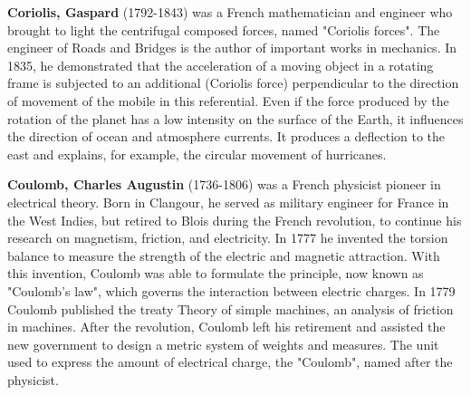 \textbf{Coriolis, Gaspard} (1792-1843) was a French mathematician and engineer who brought to light the centrifugal composed forces, named "Coriolis forces". The engineer of Roads and Bridges is the author of important works in mechanics. In 1835, he demonstrated that the acceleration of a moving object in a rotating frame is subjected to an additional (Coriolis force) perpendicular to the direction of movement of the mobile in this referential. Even if the force produced by the rotation of the planet has a low intensity on the surface of the Earth, it influences the direction of ocean and atmosphere currents. It produces a deflection to the east and explains, for example, the circular movement of hurricanes.

\textbf{Coulomb, Charles Augustin} (1736-1806) was a French physicist pioneer in electrical theory. Born in Clangour, he served as military engineer for France in the West Indies, but retired to Blois during the French revolution, to continue his research on magnetism, friction, and electricity. In 1777 he invented the torsion balance to measure the strength of the electric and magnetic attraction. With this invention, Coulomb was able to formulate the principle, now known as "Coulomb's law", which governs the interaction between electric charges. In 1779 Coulomb published the treaty Theory of simple machines, an analysis of friction in machines. After the revolution, Coulomb left his retirement and assisted the new government to design a metric system of weights and measures. The unit used to express the amount of electrical charge, the "Coulomb", named after the physicist.

